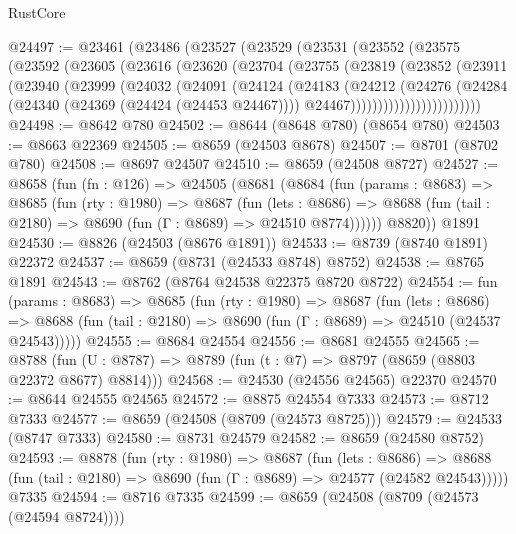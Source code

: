 \begin{lexlean}{RustCore}
\begin{coremodule}
@24497 := @23461
    (@23486
      (@23527
        (@23529
          (@23531
            (@23552
              (@23575
                (@23592
                  (@23605
                    (@23616
                      (@23620
                        (@23704
                          (@23755
                            (@23819
                              (@23852
                                (@23911
                                  (@23940
                                    (@23999
                                      (@24032
                                        (@24091
                                          (@24124
                                            (@24183
                                              (@24212
                                                (@24276
                                                  (@24284
                                                    (@24340 (@24369 (@24424 (@24453 @24467))))
                                                    @24467))))))))))))))))))))))))
@24498 := @8642 @780
@24502 := @8644 (@8648 @780) (@8654 @780)
@24503 := @8663 @22369
@24505 := @8659 (@24503 @8678)
@24507 := @8701 (@8702 @780)
@24508 := @8697 @24507
@24510 := @8659 (@24508 @8727)
@24527 := @8658
    (fun (fn : @126) =>
    @24505
      (@8681
        (@8684
          (fun (params : @8683) =>
          @8685
            (fun (rty : @1980) =>
            @8687
              (fun (lets : @8686) =>
              @8688 (fun (tail : @2180) => @8690 (fun (Γ : @8689) => @24510 @8774))))))
        @8820))
    @1891
@24530 := @8826 (@24503 (@8676 @1891))
@24533 := @8739 (@8740 @1891) @22372
@24537 := @8659 (@8731 (@24533 @8748) @8752)
@24538 := @8765 @1891
@24543 := @8762 (@8764 @24538 @22375 @8720 @8722)
@24554 := fun (params : @8683) =>
  @8685
    (fun (rty : @1980) =>
    @8687
      (fun (lets : @8686) =>
      @8688 (fun (tail : @2180) => @8690 (fun (Γ : @8689) => @24510 (@24537 @24543)))))
@24555 := @8684 @24554
@24556 := @8681 @24555
@24565 := @8788
    (fun (U : @8787) => @8789 (fun (t : @7) => @8797 (@8659 (@8803 @22372 @8677) @8814)))
@24568 := @24530 (@24556 @24565) @22370
@24570 := @8644 @24555 @24565
@24572 := @8875 @24554 @7333
@24573 := @8712 @7333
@24577 := @8659 (@24508 (@8709 (@24573 @8725)))
@24579 := @24533 (@8747 @7333)
@24580 := @8731 @24579
@24582 := @8659 (@24580 @8752)
@24593 := @8878
    (fun (rty : @1980) =>
    @8687
      (fun (lets : @8686) =>
      @8688 (fun (tail : @2180) => @8690 (fun (Γ : @8689) => @24577 (@24582 @24543)))))
    @7335
@24594 := @8716 @7335
@24599 := @8659 (@24508 (@8709 (@24573 (@24594 @8724))))

\end{coremodule}
\end{lexlean}
